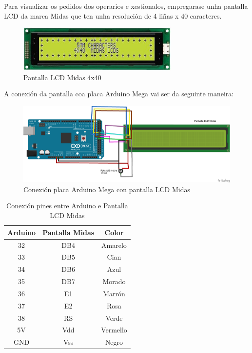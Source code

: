 \documentclass[11pt,twoside]{book}
\begin{document}
Para visualizar os pedidos dos operarios e xestionalos, empregarase unha pantalla LCD da marca Midas que ten unha resolución de 4 liñas x 40 caracteres. 

\begin{figure}[H]
	\begin{center}
		\includegraphics[width=8cm]{images/lcd.jpg}
	\end{center}
	\caption{Pantalla LCD Midas 4x40}
	\label{fig:PantallaLCD}
\end{figure}

A conexión da pantalla coa placa Arduino Mega vai ser da seguinte maneira:

\begin{figure}[H]
	\begin{center}
		\includegraphics[width=15cm]{images/conexionArduinoLCD.png}
	\end{center}
	\caption{Conexión placa Arduino Mega con pantalla LCD Midas}
	\label{fig:ConexionPantalla}
\end{figure}

\begin{table}[h]
\begin{center}
\begin{tabular}{|c|c|c|}
\hline
Arduino & Pantalla Midas & Color \\
\hline
32 & DB4 & Amarelo \\
\hline
33 & DB5 & Cian\\
\hline
34 & DB6 & Azul \\
\hline
35 & DB7 & Morado \\
\hline
36 & E1 & Marrón \\
\hline
37 & E2 & Rosa \\
\hline
38 & RS & Verde \\
\hline
5V & Vdd & Vermello \\
\hline
GND & Vss & Negro \\
\hline
\end{tabular}
\caption{Conexión pines entre Arduino e Pantalla LCD Midas}
\label{TablaArduinoPantalla}
\end{center}
\end{table}
\end{document}

